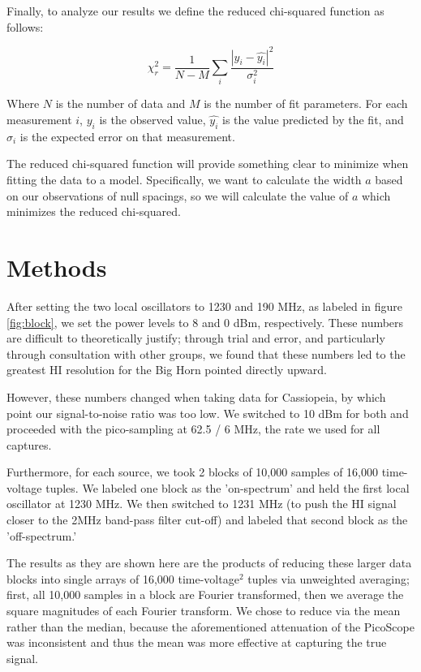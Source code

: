 \documentclass[12pt]{article}
\begin{document}
Finally, to analyze our results we define the reduced chi-squared function as follows:

\begin{equation}
\chi_r^2 = \frac{1}{N - M} \sum_i \frac{|y_i - \hat{y_i}|^2}{\sigma_i^2}
\end{equation}

Where $N$ is the number of data and $M$ is the number of fit parameters. For each measurement $i$, $y_i$ is the observed value, $\hat{y_i}$ is the value predicted by the fit, and $\sigma_i$ is the expected error on that measurement.

The reduced chi-squared function will provide something clear to minimize when fitting the data to a model. Specifically, we want to calculate the width $a$ based on our observations of null spacings, so we will calculate the value of $a$ which minimizes the reduced chi-squared.

\section{Methods}


\quad \quad After setting the two local oscillators to 1230 and 190 MHz, as labeled in figure \ref{fig:block}, we set the power levels to 8 and 0 dBm, respectively. These numbers are difficult to theoretically justify; through trial and error, and particularly through consultation with other groups, we found that these numbers led to the greatest HI resolution for the Big Horn pointed directly upward.

However, these numbers changed when taking data for Cassiopeia, by which point our signal-to-noise ratio was too low. We switched to 10 dBm for both and proceeded with the pico-sampling at 62.5 / 6 MHz, the rate we used for all captures.

Furthermore, for each source, we took 2 blocks of 10,000 samples of 16,000 time-voltage tuples. We labeled one block as the 'on-spectrum' and held the first local oscillator at 1230 MHz. We then switched to 1231 MHz (to push the HI signal closer to the 2MHz band-pass filter cut-off) and labeled that second block as the 'off-spectrum.'

The results as they are shown here are the products of reducing these larger data blocks into single arrays of 16,000 time-voltage$^2$ tuples via unweighted averaging; first, all 10,000 samples in a block are Fourier transformed, then we average the square magnitudes of each Fourier transform. We chose to reduce via the mean rather than the median, because the aforementioned attenuation of the PicoScope was inconsistent and thus the mean was more effective at capturing the true signal.
\end{document}
